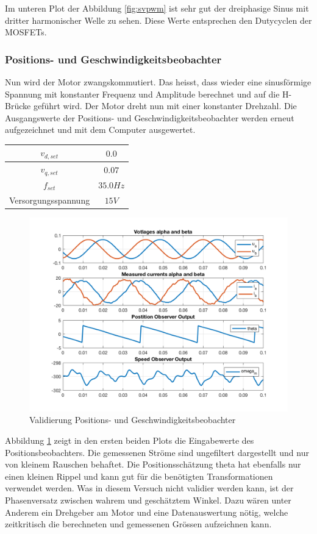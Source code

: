Im unteren Plot der Abbildung \ref{fig:svpwm} ist sehr gut der dreiphasige Sinus mit dritter harmonischer Welle zu sehen. Diese Werte entsprechen den Dutycyclen der MOSFETs.

\subsubsection*{Positions- und Geschwindigkeitsbeobachter} \label{val:obs}
Nun wird der Motor zwangskommutiert. Das heisst, dass wieder eine sinusförmige Spannung mit konstanter Frequenz und Amplitude berechnet und auf die H-Brücke geführt wird. Der Motor dreht nun mit einer konstanter Drehzahl. Die Ausgangswerte der Positions- und Geschwindigkeitsbeobachter werden erneut aufgezeichnet und mit dem Computer ausgewertet.

\begin{center}
	\begin{tabular}{|c|c|}
		\hline 
		$v_{d,set}$ & $0.0$ \\ \hline
		$v_{q,set}$ & $0.07$ \\ \hline
		$f_{set}$ & $35.0Hz$ \\ \hline
		Versorgungsspannung & $15V$ \\ \hline
	\end{tabular} 
	\label{tab:obsmessbed}
\end{center}

\begin{figure} [H]
	\centering
	\includegraphics[width=0.8\linewidth]{images/valmcobserver.png}
	\caption{Validierung Positions- und Geschwindigkeitsbeobachter}
	\label{fig:observer}
\end{figure}

Abbildung \ref{fig:observer} zeigt in den ersten beiden Plots die Eingabewerte des Positionsbeobachters. Die gemessenen Ströme sind ungefiltert dargestellt und nur von kleinem Rauschen behaftet. Die Positionsschätzung theta hat ebenfalls nur einen kleinen Rippel und kann gut für die benötigten Transformationen verwendet werden.
Was in diesem Versuch nicht validier werden kann, ist der Phasenversatz zwischen wahrem und geschätztem Winkel. Dazu wären unter Anderem ein Drehgeber am Motor und eine Datenauswertung nötig, welche zeitkritisch die berechneten und gemessenen Grössen aufzeichnen kann.

